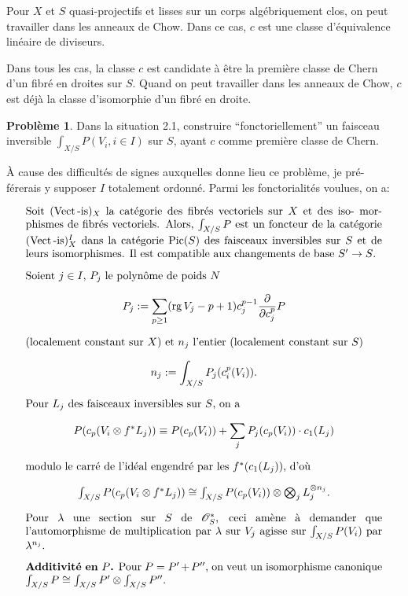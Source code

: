 \documentclass[12pt,a4paper]{article}
\theoremstyle{plain}
\theoremstyle{definition}
\newtheorem{probleme}[theorem]{Probl\`eme}
\DeclareMathOperator{\rank}{rg}
\DeclareMathOperator{\Pic}{Pic}
\DeclareMathOperator{\Vect}{Vect}
\newcommand{\Oo}{\mathscr{O}}
\begin{document}
Pour $X$ et $S$ quasi-projectifs et lisses sur un corps alg\'ebriquement clos,
on peut travailler dans les anneaux de Chow. Dans ce cas, $c$ est une classe
d'\'equivalence lin\'eaire de diviseurs.

Dans tous les cas, la classe $c$ est candidate \`a \^etre la premi\`ere classe
de Chern d'un fibr\'e en droites sur $S$. Quand on peut travailler dans les anneaux
de Chow, $c$ est d\'ej\`a la classe d'isomorphie d'un fibr\'e en droite.

\begin{probleme}
Dans la situation 2.1, construire ``fonctoriellement'' un faisceau
inversible $\int_{X/S} P(V_i, i \in I)$ sur $S$, ayant $c$ comme premi\`ere classe de Chern.
\end{probleme}

\`A cause des difficult\'es de signes auxquelles donne lieu ce probl\`eme, je pr\'e-
f\'ererais y supposer $I$ totalement ordonn\'e. Parmi les fonctorialit\'es voulues,
on a:

\begin{equation}\label{eq:2.1.3}
\parbox{\dimexpr\linewidth-2em}{%
Soit $(\Vect\text{-is})_X$ la cat\'egorie des fibr\'es vectoriels sur $X$ et des iso-
morphismes de fibr\'es vectoriels. Alors, $\int_{X/S} P$ est un foncteur de la cat\'egorie
$(\Vect\text{-is})_X^I$ dans la cat\'egorie $\Pic(S)$ des faisceaux inversibles sur $S$ et de
leurs isomorphismes. Il est compatible aux changements de base $S' \to S$.}
\end{equation}

\begin{equation}\label{eq:2.1.4}
\parbox{\dimexpr\linewidth-2em}{%
Soient $j \in I$, $P_j$ le polyn\^ome de poids $N$
\[
P_j := \sum_{p \geq 1} (\rank V_j - p + 1) c_j^{p-1} \frac{\partial}{\partial c_j^p} P
\]
(localement constant sur $X$) et $n_j$ l'entier (localement constant sur $S$)
\[
n_j := \int_{X/S} P_j(c_i^p(V_i)) .
\]
Pour $L_j$ des faisceaux inversibles sur $S$, on a
\[
P(c_p(V_i \otimes f^* L_j)) \equiv P(c_p(V_i)) + \sum_j P_j(c_p(V_i)) \cdot c_1(L_j)
\]
modulo le carr\'e de l'id\'eal engendr\'e par les $f^*(c_1(L_j))$, d'o\`u
\[
\textstyle \int_{X/S} P(c_p(V_i \otimes f^* L_j)) \cong \int_{X/S} P(c_p(V_i)) \otimes \bigotimes_j L_j^{\otimes n_j} .
\]
Pour $\lambda$ une section sur $S$ de $\Oo_S^*$, ceci am\`ene \`a demander que l'automorphisme
de multiplication par $\lambda$ sur $V_j$ agisse sur $\int_{X/S} P(V_i)$ par $\lambda^{n_j}$.}
\end{equation}

\begin{equation}\label{eq:2.1.5}
\parbox{\dimexpr\linewidth-2em}{%
\textbf{Additivit\'e en $P$.} Pour $P = P' + P''$, on veut un isomorphisme canonique
$\int_{X/S} P \cong \int_{X/S} P' \otimes \int_{X/S} P''$.}
\end{equation}
\end{document}
